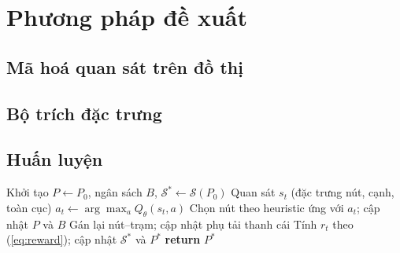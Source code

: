 \documentclass[10pt, conference, a4paper, compsocconf]{IEEEtran}
\begin{document}
\section{Phương pháp đề xuất}

\subsection{Mã hoá quan sát trên đồ thị}

\subsection{Bộ trích đặc trưng}

\subsection{Huấn luyện}

\begin{algorithm}
\caption{Một episode mở rộng kế hoạch trạm sạc}
\label{alg:rollout}
\begin{algorithmic}[1]
\STATE Khởi tạo $P \leftarrow P_0$, ngân sách $B$, $\mathcal{S}^{*} \leftarrow \mathcal{S}(P_0)$
  \STATE Quan sát $s_t$ (đặc trưng nút, cạnh, toàn cục)
  \STATE $a_t \leftarrow \arg\max_a Q_\theta(s_t,a)$ 
  \STATE Chọn nút theo heuristic ứng với $a_t$; cập nhật $P$ và $B$
  \STATE Gán lại nút--trạm; cập nhật phụ tải thanh cái
  \STATE Tính $r_t$ theo (\ref{eq:reward}); cập nhật $\mathcal{S}^{*}$ và $P^{*}$
\ENDWHILE
\STATE \textbf{return} $P^{*}$
\end{algorithmic}
\end{algorithm}
\end{document}
